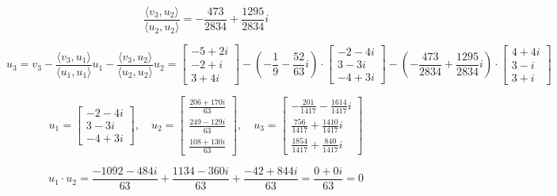 \documentclass{article}
\begin{document}
\begin{equation}
    \frac{\langle v_3,u_2 \rangle}{\langle u_2, u_2 \rangle}
    = -\frac{473}{2834}+\frac{1295}{2834}i\nonumber
\end{equation}


\begin{equation}
u_3= v_3-\frac{\langle v_3,u_1 \rangle}{\langle u_1,u_1 \rangle}u_1 - \frac{\langle v_3,u_2 \rangle}{\langle u_2, u_2 \rangle}u_2
=
\begin{bmatrix}
-5+2i\\
-2+i\\
3+4i
\end{bmatrix}
- (-\frac{1}{9}-\frac{52}{63}i\nonumber)
\cdot
\begin{bmatrix}
-2-4i\\
3-3i\\
-4+3i
\end{bmatrix}
- (-\frac{473}{2834}+\frac{1295}{2834}i\nonumber)
\cdot
\begin{bmatrix}
4+4i\\
3-i\\
3+i
\end{bmatrix}
\end{equation}


\begin{equation}
u_1=
\begin{bmatrix}
-2-4i\\
3-3i\\
-4+3i
\end{bmatrix}, \quad
u_2=
\begin{bmatrix}
    \frac{206+170i}{63}\\
    \frac{249-129i}{63}\\
    \frac{108+130i}{63}
\end{bmatrix}, \quad
u_3 =
\begin{bmatrix}
-\frac{201}{1417}-\frac{1614}{1417}i\\
\frac{756}{1417}+\frac{1410}{1417}i\\
\frac{1854}{1417}+\frac{840}{1417}i\nonumber
\end{bmatrix}
\end{equation}


\begin{equation}
    u_1 \cdot u_2 = \frac{-1092-484i}{63} + \frac{1134-360i}{63} + \frac{-42+844i}{63} = \frac{0 + 0i}{63} = 0 \nonumber
\end{equation}
\end{document}
